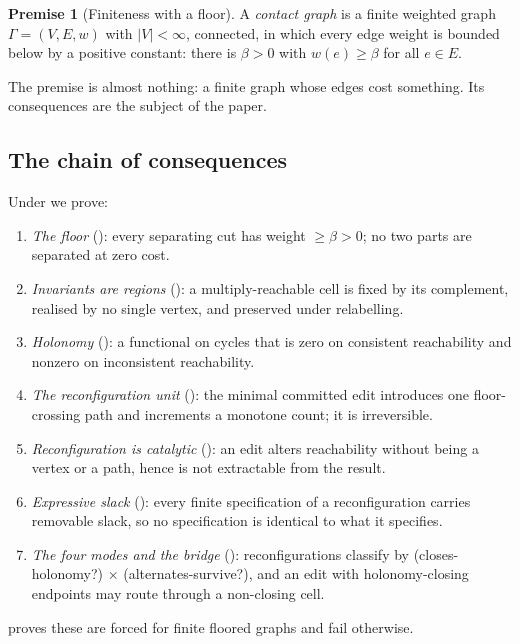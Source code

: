 \documentclass[11pt,a4paper]{article}
\theoremstyle{thmstyle}
\theoremstyle{definition}
\newtheorem{axiom}{Premise}
\theoremstyle{remark}
\newcommand{\Gph}{\Gamma}
\newcommand{\V}{V}
\newcommand{\E}{E}
\newcommand{\wt}{w}
\newcommand{\floorc}{\beta}
\newcommand{\abs}[1]{\lvert#1\rvert}
\begin{document}
\begin{axiom}[Finiteness with a floor]
\label{ax:finite}
A \emph{contact graph} is a finite weighted graph $\Gph=(\V,\E,\wt)$ with
$\abs{\V}<\infty$, connected, in which every edge weight is bounded below by
a positive constant: there is $\floorc>0$ with $\wt(e)\ge\floorc$ for all
$e\in\E$.
\end{axiom}

The premise is almost nothing: a finite graph whose edges cost something.
Its consequences are the subject of the paper.

\subsection{The chain of consequences}

Under  we prove:

\begin{enumerate}[label=\textbf{(T\arabic*)},leftmargin=3em,start=0]
\item \emph{The floor} (): every separating cut has weight
$\ge\floorc>0$; no two parts are separated at zero cost.
\item \emph{Invariants are regions} (): a
multiply-reachable cell is fixed by its complement, realised by no single
vertex, and preserved under relabelling.
\item \emph{Holonomy} (): a functional on cycles that is
zero on consistent reachability and nonzero on inconsistent reachability.
\item \emph{The reconfiguration unit} (): the minimal
committed edit introduces one floor-crossing path and increments a monotone
count; it is irreversible.
\item \emph{Reconfiguration is catalytic} (): an edit
alters reachability without being a vertex or a path, hence is not
extractable from the result.
\item \emph{Expressive slack} (): every finite specification
of a reconfiguration carries removable slack, so no specification is
identical to what it specifies.
\item \emph{The four modes and the bridge} ():
reconfigurations classify by (closes-holonomy?) $\times$
(alternates-survive?), and an edit with holonomy-closing endpoints may route
through a non-closing cell.
\end{enumerate}

 proves these are forced for finite floored graphs and fail
otherwise.
\end{document}
